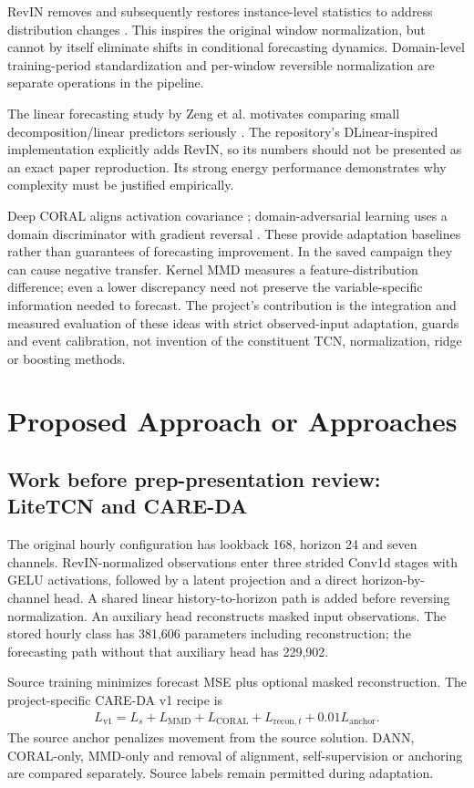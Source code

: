 RevIN removes and subsequently restores instance-level statistics to address distribution changes \citep{Kim22}. This inspires the original window normalization, but cannot by itself eliminate shifts in conditional forecasting dynamics. Domain-level training-period standardization and per-window reversible normalization are separate operations in the pipeline.

The linear forecasting study by Zeng et al. motivates comparing small decomposition/linear predictors seriously \citep{Zeng23}. The repository's DLinear-inspired implementation explicitly adds RevIN, so its numbers should not be presented as an exact paper reproduction. Its strong energy performance demonstrates why complexity must be justified empirically.

Deep CORAL aligns activation covariance \citep{Sun16}; domain-adversarial learning uses a domain discriminator with gradient reversal \citep{Ganin16}. These provide adaptation baselines rather than guarantees of forecasting improvement. In the saved campaign they can cause negative transfer. Kernel MMD measures a feature-distribution difference; even a lower discrepancy need not preserve the variable-specific information needed to forecast. The project's contribution is the integration and measured evaluation of these ideas with strict observed-input adaptation, guards and event calibration, not invention of the constituent TCN, normalization, ridge or boosting methods.

\section{Proposed Approach or Approaches}\label{sec:our_proj}
\subsection{Work before prep-presentation review: LiteTCN and CARE-DA}
The original hourly configuration has lookback 168, horizon 24 and seven channels. RevIN-normalized observations enter three strided Conv1d stages with GELU activations, followed by a latent projection and a direct horizon-by-channel head. A shared linear history-to-horizon path is added before reversing normalization. An auxiliary head reconstructs masked input observations. The stored hourly class has 381,606 parameters including reconstruction; the forecasting path without that auxiliary head has 229,902.

Source training minimizes forecast MSE plus optional masked reconstruction. The project-specific CARE-DA v1 recipe is
\begin{align}
L_{\mathrm{v1}}=L_{s}+L_{\mathrm{MMD}}+L_{\mathrm{CORAL}}+L_{\mathrm{recon},t}+0.01L_{\mathrm{anchor}}.
\end{align}
The source anchor penalizes movement from the source solution. DANN, CORAL-only, MMD-only and removal of alignment, self-supervision or anchoring are compared separately. Source labels remain permitted during adaptation.

